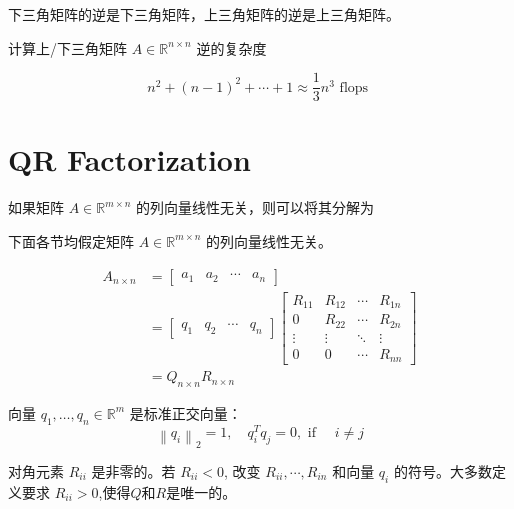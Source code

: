 \begin{theorem}
    下三角矩阵的逆是下三角矩阵，上三角矩阵的逆是上三角矩阵。
\end{theorem}

计算上/下三角矩阵 $  {A} \in \mathbb{R}^{n \times n} $ 逆的复杂度

$$ n^{2}+(n-1)^{2}+\cdots+1 \approx \frac{1}{3} n^{3}\text{ flops }$$ 

\section{QR Factorization}

如果矩阵 $ A \in \mathbb{R}^{m \times n} $ 的列向量线性无关，则可以将其分解为

\begin{remark}
    下面各节均假定矩阵 $ A \in \mathbb{R}^{m \times n} $ 的列向量线性无关。
\end{remark}

\begin{theorem}[QR Factorization]
    
    $$\begin{aligned} A_{n  \times n}&=\left[\begin{array}{llll}a_{1} & a_{2} & \cdots & a_{n}\end{array}\right]\\
        &=\left[\begin{array}{llll}q_{1} & q_{2} & \cdots & q_{n}\end{array}\right]\left[\begin{array}{cccc}R_{11} & R_{12} & \cdots & R_{1 n} \\ 0 & R_{22} & \cdots & R_{2 n} \\ \vdots & \vdots & \ddots & \vdots \\ 0 & 0 & \cdots & R_{n n}\end{array}\right]\\
        &=Q_{n  \times n}R_{n  \times  n}
        \end{aligned}$$

向量 $ q_{1}, \ldots, q_{n} \in \mathbb{R}^{m} $ 是标准正交向量：
$$
\left\|q_{i}\right\|_{2}=1, \quad q_{i}^{T} q_{j}=0, \text { if } \quad i \neq j
$$

对角元素 $ R_{i i} $ 是非零的。若 $ R_{i i}<0 $, 改变 $ R_{i i}, \cdots, R_{i n} $ 和向量 $ q_{i} $ 的符号。大多数定义要求 $ R_{i i}>0 $,使得$Q$和$R$是唯一的。
\end{theorem}



